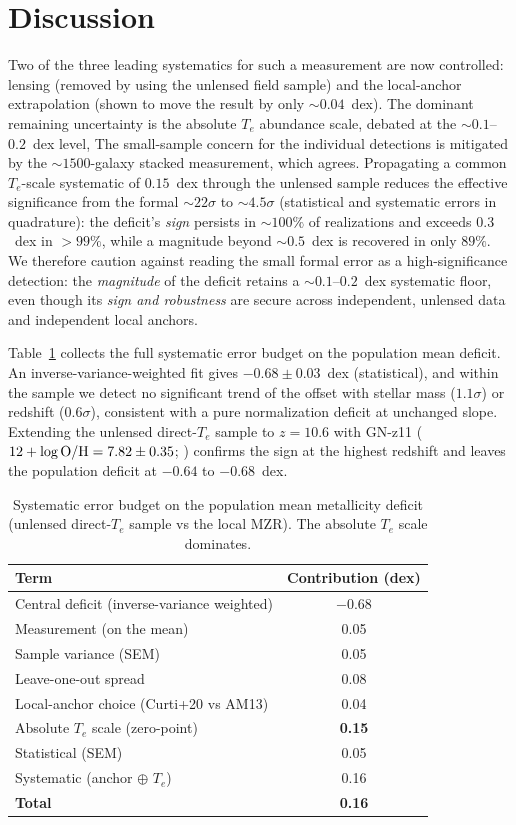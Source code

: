 \documentclass[twocolumn]{aastex631}
\begin{document}
\section{Discussion}
Two of the three leading systematics for such a measurement are now controlled: lensing (removed by using
the unlensed field sample) and the local-anchor extrapolation (shown to move the result by only
$\sim0.04$~dex). The dominant remaining uncertainty is the absolute $T_e$ abundance scale, debated at the
$\sim0.1$--$0.2$~dex level, The small-sample concern for the individual detections is mitigated by the $\sim1500$-galaxy stacked
measurement, which agrees. Propagating a common $T_e$-scale systematic of $0.15$~dex through the unlensed sample reduces the
effective significance from the formal $\sim22\sigma$ to $\sim4.5\sigma$ (statistical and systematic
errors in quadrature): the deficit's \emph{sign} persists in $\sim100\%$ of realizations and exceeds
$0.3$~dex in $>99\%$, while a magnitude beyond $\sim0.5$~dex is recovered in only $89\%$. We therefore caution against
reading the small formal error as a high-significance detection: the \emph{magnitude} of the deficit
retains a $\sim0.1$--$0.2$~dex systematic floor, even though its \emph{sign and robustness} are secure
across independent, unlensed data and independent local anchors.

Table~\ref{tab:budget} collects the full systematic error budget on the population mean deficit. An
inverse-variance-weighted fit gives $-0.68\pm0.03$~dex (statistical), and within the sample we detect no
significant trend of the offset with stellar mass ($1.1\sigma$) or redshift ($0.6\sigma$), consistent with
a pure normalization deficit at unchanged slope. Extending the unlensed direct-$T_e$ sample to $z=10.6$
with GN-z11 ($12+\log{\rm O/H}=7.82\pm0.35$; \citealt{curti23}) confirms the sign at the highest redshift
and leaves the population deficit at $-0.64$ to $-0.68$~dex.

\begin{table}[htb]
\centering
\caption{Systematic error budget on the population mean metallicity deficit (unlensed direct-$T_e$ sample
vs the local MZR). The absolute $T_e$ scale dominates.\label{tab:budget}}
\begin{tabular}{lc}
\hline
Term & Contribution (dex) \\
\hline
Central deficit (inverse-variance weighted) & $-0.68$ \\
\hline
Measurement (on the mean)      & 0.05 \\
Sample variance (SEM)          & 0.05 \\
Leave-one-out spread           & 0.08 \\
Local-anchor choice (Curti+20 vs AM13) & 0.04 \\
Absolute $T_e$ scale (zero-point) & \textbf{0.15} \\
\hline
Statistical (SEM)              & 0.05 \\
Systematic (anchor $\oplus$ $T_e$) & 0.16 \\
\textbf{Total}                 & \textbf{0.16} \\
\hline
\end{tabular}
\end{table}
\end{document}
